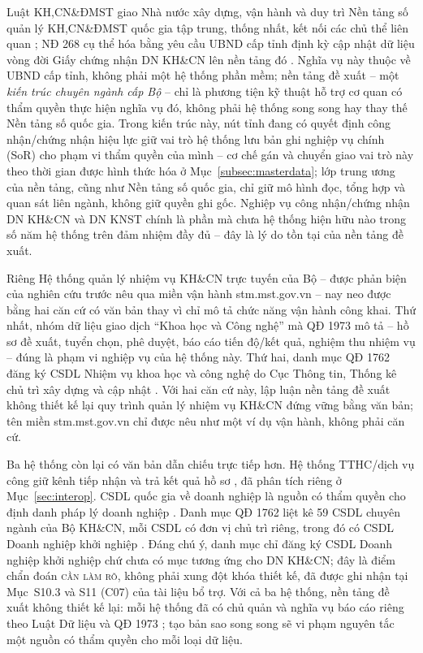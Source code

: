 Luật KH,CN\&ĐMST giao Nhà nước xây dựng, vận hành và duy trì Nền tảng số quản lý KH,CN\&ĐMST quốc gia tập trung, thống nhất, kết nối các chủ thể liên quan \citep[khoản 3 Điều 20]{luatkhcndmst2025}; NĐ 268 cụ thể hóa bằng yêu cầu UBND cấp tỉnh định kỳ cập nhật dữ liệu vòng đời Giấy chứng nhận DN KH\&CN lên nền tảng đó \citep[khoản 3 Điều 48]{nd268_2025}. Nghĩa vụ này thuộc về UBND cấp tỉnh, không phải một hệ thống phần mềm; nền tảng đề xuất -- một \emph{kiến trúc chuyên ngành cấp Bộ} -- chỉ là phương tiện kỹ thuật hỗ trợ cơ quan có thẩm quyền thực hiện nghĩa vụ đó, không phải hệ thống song song hay thay thế Nền tảng số quốc gia. Trong kiến trúc này, nút tỉnh đang có quyết định công nhận/chứng nhận hiệu lực giữ vai trò hệ thống lưu bản ghi nghiệp vụ chính (SoR) cho phạm vi thẩm quyền của mình -- cơ chế gán và chuyển giao vai trò này theo thời gian được hình thức hóa ở Mục~\ref{subsec:masterdata}; lớp trung ương của nền tảng, cũng như Nền tảng số quốc gia, chỉ giữ mô hình đọc, tổng hợp và quan sát liên ngành, không giữ quyền ghi gốc. Nghiệp vụ công nhận/chứng nhận DN KH\&CN và DN KNST chính là phần mà chưa hệ thống hiện hữu nào trong số năm hệ thống trên đảm nhiệm đầy đủ -- đây là lý do tồn tại của nền tảng đề xuất.

Riêng Hệ thống quản lý nhiệm vụ KH\&CN trực tuyến của Bộ -- được phản biện của nghiên cứu trước nêu qua miền vận hành stm.mst.gov.vn -- nay neo được bằng hai căn cứ có văn bản thay vì chỉ mô tả chức năng vận hành công khai. Thứ nhất, nhóm dữ liệu giao dịch ``Khoa học và Công nghệ'' mà QĐ 1973 mô tả -- hồ sơ đề xuất, tuyển chọn, phê duyệt, báo cáo tiến độ/kết quả, nghiệm thu nhiệm vụ \citep{qd1973_2026} -- đúng là phạm vi nghiệp vụ của hệ thống này. Thứ hai, danh mục QĐ 1762 đăng ký CSDL Nhiệm vụ khoa học và công nghệ do Cục Thông tin, Thống kê chủ trì xây dựng và cập nhật \citep[Phụ lục, STT 43]{qd1762_2025}. Với hai căn cứ này, lập luận nền tảng đề xuất không thiết kế lại quy trình quản lý nhiệm vụ KH\&CN đứng vững bằng văn bản; tên miền stm.mst.gov.vn chỉ được nêu như một ví dụ vận hành, không phải căn cứ.

Ba hệ thống còn lại có văn bản dẫn chiếu trực tiếp hơn. Hệ thống TTHC/dịch vụ công giữ kênh tiếp nhận và trả kết quả hồ sơ \citep{nd268_2025,nd278_2025}, đã phân tích riêng ở Mục~\ref{sec:interop}. CSDL quốc gia về doanh nghiệp là nguồn có thẩm quyền cho định danh pháp lý doanh nghiệp \citep{luatdulieu2024,nd278_2025,qd1973_2026}. Danh mục QĐ 1762 liệt kê 59 CSDL chuyên ngành của Bộ KH\&CN, mỗi CSDL có đơn vị chủ trì riêng, trong đó có CSDL Doanh nghiệp khởi nghiệp \citep[Phụ lục, STT 38]{qd1762_2025}. Đáng chú ý, danh mục chỉ đăng ký CSDL Doanh nghiệp khởi nghiệp chứ chưa có mục tương ứng cho DN KH\&CN; đây là điểm chẩn đoán \textsc{cần làm rõ}, không phải xung đột khóa thiết kế, đã được ghi nhận tại Mục~S10.3 và S11 (C07) của tài liệu bổ trợ. Với cả ba hệ thống, nền tảng đề xuất không thiết kế lại: mỗi hệ thống đã có chủ quản và nghĩa vụ báo cáo riêng theo Luật Dữ liệu và QĐ 1973 \citep{luatdulieu2024,qd1973_2026}; tạo bản sao song song sẽ vi phạm nguyên tắc một nguồn có thẩm quyền cho mỗi loại dữ liệu.

